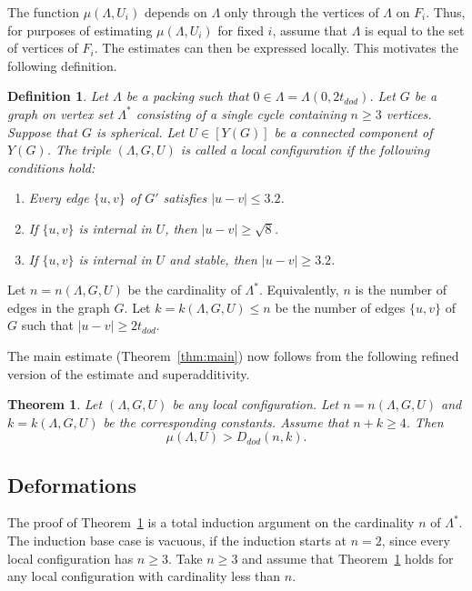 \documentclass{article} %
\newtheorem{theorem}{Theorem}[section]
\newtheorem{definition}[lemma]{Definition}
\begin{document}
The function $\mu(\Lambda,U_i)$ depends on $\Lambda$ only through
the vertices of $\Lambda$ on $F_i$.  Thus, for purposes of estimating
$\mu(\Lambda,U_i)$ for fixed $i$,  assume that $\Lambda$
is equal to the set of vertices of $F_i$.  The estimates can then
be expressed locally.
   This motivates the following definition.

\begin{definition}
Let $\Lambda$ be a packing such that $0\in\Lambda=\Lambda(0,2t_{dod})$.  
Let $G$ be a graph on vertex set $\Lambda^*$ 
consisting
of a single cycle containing $n\ge 3$ vertices.  
Suppose that $G$ is spherical. 
Let $U\in [Y(G)]$ be a connected component of $Y(G)$.  
The triple $(\Lambda,G,U)$ is called a {\it local configuration} if the
following conditions hold:
\begin{enumerate}
\item Every edge $\{u,v\}$ of $G'$ satisfies $|u-v|\le 3.2$.
\item If
$\{u,v\}$ is internal in  $U$, then $|u-v|\ge \sqrt8$.
\item If $\{u,v\}$ is internal in $U$ and stable,
then $|u-v|\ge 3.2$.
\end{enumerate}
\end{definition}


Let $n=n(\Lambda,G,U)$ be the cardinality of $\Lambda^*$.  Equivalently,
$n$ is the number of edges in the graph $G$.  Let
$k=k(\Lambda,G,U)\le n$ be the number of edges $\{u,v\}$ of $G$ such
that $|u-v|\ge 2t_{dod}$. 

The main estimate (Theorem~\ref{thm:main}) now follows from the following
refined version of the estimate and superadditivity.

\begin{theorem}\label{thm:main'}  
Let $(\Lambda,G,U)$ be any local configuration.
Let $n=n(\Lambda,G,U)$ and $k=k(\Lambda,G,U)$ be the corresponding constants.
Assume that $n+k\ge 4$.  Then
   $$
   \mu(\Lambda,U) > D_{dod}(n,k).
   $$
\end{theorem}

\subsection{Deformations}

The proof of Theorem~\ref{thm:main'} is a total induction argument on
the cardinality $n$ of $\Lambda^*$. The induction base case is
vacuous, if the induction starts at $n=2$, since every local
configuration has $n\ge 3$. Take $n\ge 3$ and assume that
Theorem~\ref{thm:main'} holds for any local configuration with
cardinality less than $n$.
\end{document}
